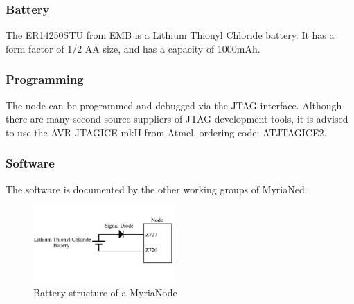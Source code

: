 \documentclass[a4paper,10pt]{report}
\begin{document}
\subsubsection{Battery}
The ER14250STU from EMB is a Lithium Thionyl Chloride battery. It has a form factor of 1/2 AA size, and has a capacity of 1000mAh.
\subsubsection{Programming}
The node can be programmed and debugged via the JTAG interface. Although there are many second source suppliers of JTAG development tools, it is advised to use the AVR JTAGICE mkII from Atmel, ordering code: ATJTAGICE2.
\subsubsection{Software}
The software is documented by the other working groups of MyriaNed.
\begin{figure}
\centering
    \includegraphics[width=0.48\textwidth]{battery}
  \caption{Battery structure of  a MyriaNode}
  \label{battery}
\end{figure}
\end{document}
